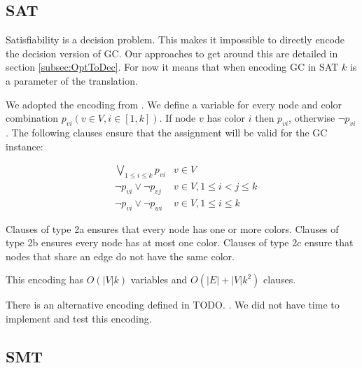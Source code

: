 \documentclass{sig-alternate}
\begin{document}
\subsection{SAT}

Satisfiability is a decision problem. This makes it impossible to directly encode the decision version of GC. Our approaches to get around this are detailed in section \ref{subsec:OptToDec}. For now it means that when encoding GC in SAT $k$ is a parameter of the translation.

We adopted the encoding from \cite{cs395tGCtoSAT}. We define a variable for every node and color combination $p_{vi} (v \in V, i \in [1,k])$. If node $v$ has color $i$ then $p_{vi}$, otherwise $\neg p_{vi}$. The following clauses ensure that the assignment will be valid for the GC instance:

\setcounter{equation}{1}
\begin{subequations}
\begin{align}
        & \bigvee_{1 \leq i \leq k} p_{vi}& v \in V\\
        & \neg p_{vi} \lor \neg p_{vj} & v \in V, 1 \leq i < j \leq k \\
        & \neg p_{vi} \lor \neg p_{wi} & v \in V, 1 \leq i \leq k
\end{align}
\end{subequations}

Clauses of type 2a ensures that every node has one or more colors. Clauses of type 2b ensures every node has at most one color. Clauses of type 2c ensure that nodes that share an edge do not have the same color.

This encoding has $O(|V| k)$ variables and $O(|E|+|V| k^2)$ clauses.

There is an alternative encoding defined in TODO. . We did not have time to implement and test this encoding.

\subsection{SMT}
\end{document}
